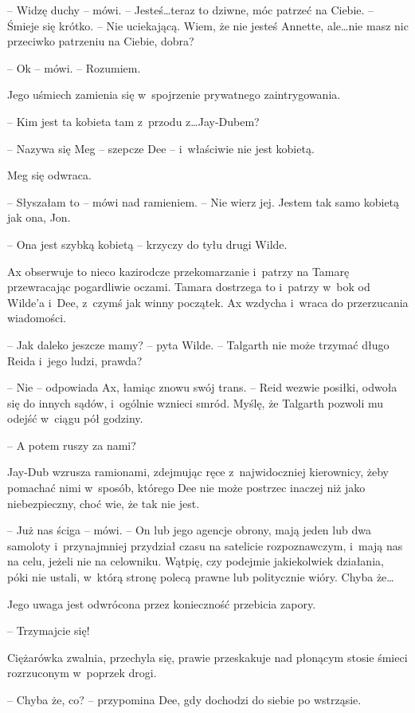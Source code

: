 \documentclass[oneside,polish,11pt,sfheadings]{mwbk}
\begin{document}
-- Widzę duchy -- mówi. -- Jesteś\ldots teraz to dziwne, móc patrzeć na
Ciebie. -- Śmieje się krótko. -- Nie uciekającą. Wiem, że nie jesteś
Annette, ale\ldots nie masz nic przeciwko patrzeniu na Ciebie, dobra?

-- Ok -- mówi. -- Rozumiem.

Jego uśmiech zamienia się w~spojrzenie prywatnego zaintrygowania.

-- Kim jest ta kobieta tam z~przodu z\ldots Jay-Dubem?

-- Nazywa się Meg -- szepcze Dee -- i~właściwie nie jest kobietą.

Meg się odwraca. 

-- Słyszałam to -- mówi nad ramieniem. -- Nie wierz jej.
Jestem tak samo kobietą jak ona, Jon.

-- Ona jest szybką kobietą -- krzyczy do tyłu drugi Wilde.

Ax obserwuje to nieco kazirodcze przekomarzanie i~patrzy na Tamarę
przewracając pogardliwie oczami. Tamara dostrzega to i~patrzy w~bok od
Wilde'a i~Dee, z~czymś jak winny początek. Ax wzdycha i~wraca do
przerzucania wiadomości.

-- Jak daleko jeszcze mamy? -- pyta Wilde. -- Talgarth nie może trzymać
długo Reida i~jego ludzi, prawda?

-- Nie -- odpowiada Ax, łamiąc znowu swój trans. -- Reid wezwie posiłki,
odwoła się do innych sądów, i~ogólnie wznieci smród. Myślę, że Talgarth
pozwoli mu odejść w~ciągu pół godziny.

-- A potem ruszy za nami?

Jay-Dub wzrusza ramionami, zdejmując ręce z~najwidoczniej kierownicy,
żeby pomachać nimi w~sposób, którego Dee nie może postrzec inaczej niż
jako niebezpieczny, choć wie, że tak nie jest. 

-- Już nas ściga -- mówi. -- On lub jego agencje obrony, mają jeden lub dwa samoloty i~przynajmniej przydział czasu na satelicie rozpoznawczym, i~mają nas na celu, jeżeli
nie na celowniku. Wątpię, czy podejmie jakiekolwiek działania, póki nie
ustali, w~którą stronę polecą prawne lub politycznie wióry. Chyba że\ldots

Jego uwaga jest odwrócona przez konieczność przebicia zapory.

-- Trzymajcie się!

Ciężarówka zwalnia, przechyla się, prawie przeskakuje nad płonącym
stosie śmieci rozrzuconym w~poprzek drogi.

-- Chyba że, co? -- przypomina Dee, gdy dochodzi do siebie po wstrząsie.
\end{document}
